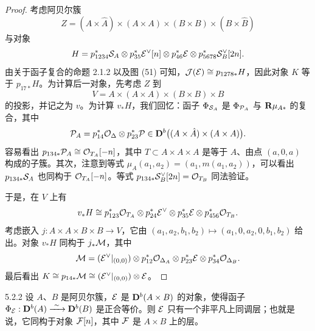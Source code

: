 \begin{proof}
考虑阿贝尔簇
\begin{equation*}
Z=(A\times\hat A)\times(A\times A)\times(B\times B)\times(B\times\hat B)
\end{equation*}
与对象
\begin{equation*}
H=p^*_{1234}\mathcal{S}_A\otimes p^*_{35}\mathcal{E}^\vee[n]\otimes p^*_{46}\mathcal{E}\otimes p^*_{5678}\mathcal{S}_B^\vee[2n].
\end{equation*}
由关于函子复合的命题 2.1.2 以及图 (51) 可知，$\mathcal{J}(\mathcal{E})\cong p_{1278*}H$，因此对象 $K$ 等于 $p_{17*}H$。为计算后一对象，先考虑 $Z$ 到
\begin{equation*}
V=A\times(A\times A)\times(B\times B)\times B
\end{equation*}
的投影，并记之为 $v$。为计算 $v_*H$，我们回忆：函子 $\Phi_{\mathcal{S}_A}$ 是 $\Phi_{\mathcal{P}_A}$ 与 $\mathbf{R}\mu_{A*}$ 的复合，其中
\begin{equation*}
\mathcal{P}_A=p^*_{14}\mathcal{O}_\Delta\otimes p^*_{23}\mathcal{P}\in\mathbf{D}^{b}\bigl((A\times\hat A)\times(A\times A)\bigr).
\end{equation*}
容易看出 $p_{134*}\mathcal{P}_A\cong\mathcal{O}_{T_A}[-n]$，其中 $T\subset A\times A\times A$ 是等于 $A$、由点 $(a,0,a)$ 构成的子簇。其次，注意到等式 $\mu_A(a_1,a_2)=(a_1,m(a_1,a_2))$，可以看出 $p_{134*}\mathcal{S}_A$ 也同构于 $\mathcal{O}_{T_A}[-n]$。等式 $p_{134*}\mathcal{S}_B^\vee[2n]=\mathcal{O}_{T_B}$ 同法验证。

于是，在 $V$ 上有
\begin{equation*}
v_*H\cong p^*_{123}\mathcal{O}_{T_A}\otimes p^*_{24}\mathcal{E}^\vee\otimes p^*_{35}\mathcal{E}\otimes p^*_{456}\mathcal{O}_{T_B}.
\end{equation*}
考虑嵌入 $j:A\times A\times B\times B\to V$，它由 $(a_1,a_2,b_1,b_2)\mapsto(a_1,0,a_2,0,b_1,b_2)$ 给出。对象 $v_*H$ 同构于 $j_*\mathcal{M}$，其中
\begin{equation*}
\mathcal{M}=(\mathcal{E}^\vee|_{(0,0)})\otimes p^*_{12}\mathcal{O}_{\Delta_A}\otimes p^*_{23}\mathcal{E}\otimes p^*_{34}\mathcal{O}_{\Delta_B}.
\end{equation*}
最后看出 $K\cong p_{14*}\mathcal{M}\cong(\mathcal{E}^\vee|_{(0,0)})\otimes\mathcal{E}$。
\end{proof}

\begin{proposition}{5.2.2}
设 $A$、$B$ 是阿贝尔簇，$\mathcal{E}$ 是 $\mathbf{D}^{b}(A\times B)$ 的对象，使得函子 $\Phi_{\mathcal{E}}:\mathbf{D}^{b}(A)\xrightarrow{\ \sim\ }\mathbf{D}^{b}(B)$ 是正合等价。则 $\mathcal{E}$ 只有一个非平凡上同调层；也就是说，它同构于对象 $\mathcal{F}[n]$，其中 $\mathcal{F}$ 是 $A\times B$ 上的层。
\end{proposition}


